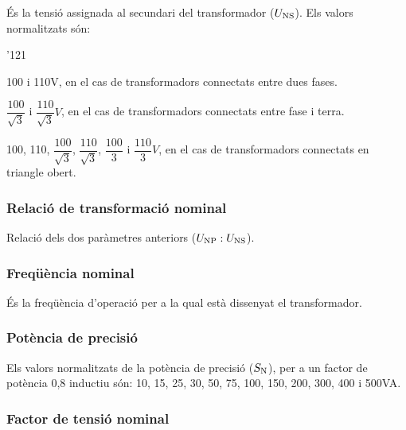 \'{E}s la tensi\'{o} assignada al secundari del transformador ($U_\mathrm{NS}$).
Els valors normalitzats s\'{o}n:
\begin{dinglist}{'121}
    \item 100 i 110\unit{V}, en el cas de transformadors connectats
    entre dues fases.
    \item $\dfrac{100}{\sqrt{3}}$ i
        $\dfrac{110}{\sqrt{3}}\unit{V}$, en el cas de transformadors
        connectats entre fase i terra.
    \item 100, 110, $\dfrac{100}{\sqrt{3}}$,
    $\dfrac{110}{\sqrt{3}}$, $\dfrac{100}{3}$   i
    $\dfrac{110}{3}\unit{V}$, en el cas de transformadors
    connectats en triangle obert.
\end{dinglist}

\subsubsection{Relaci\'{o} de transformaci\'{o} nominal}

 Relaci\'{o}  dels dos par\`{a}metres anteriors ($U_\mathrm{NP}:U_\mathrm{NS}$).

\subsubsection{Freq\"{u}\`{e}ncia nominal}

 \'{E}s la freq\"{u}\`{e}ncia d'operaci\'{o} per a la qual  est\`{a} dissenyat el transformador.

\subsubsection{Pot\`{e}ncia de precisi\'{o}}

Els valors normalitzats de la pot\`{e}ncia de precisi\'{o}
($S_\mathrm{N}$), per a un factor de pot\`{e}ncia 0,8 inductiu s\'{o}n: 10, 15, 25, 30,
50, 75, 100, 150, 200, 300, 400 i 500\unit{VA}.

\subsubsection{Factor de tensi\'{o} nominal}

